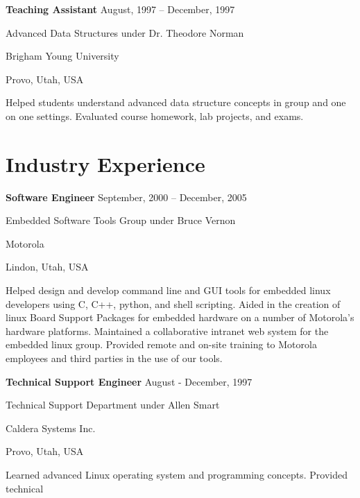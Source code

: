 \documentclass[margin,line,article,letterpaper]{res}
\newenvironment{list1}{
  \begin{list}{}{%
      \setlength{\itemsep}{0in}
      \setlength{\parsep}{0in} \setlength{\parskip}{0in}
      \setlength{\topsep}{0in} \setlength{\partopsep}{0in} 
      \setlength{\leftmargin}{0.17in}}}{\end{list}}
\newcommand{\timespan}[1]{#1}
\begin{document}
\begin{resume}
\textbf{Teaching Assistant} \hfill \timespan{August, 1997 -- December, 1997}\\
\vspace{-10pt}
\begin{list1}
\item Advanced Data Structures under Dr. Theodore Norman
\item Brigham Young University
\item Provo, Utah, USA
\vspace{6pt}
\item Helped students understand advanced data structure concepts in group and one on one 
settings. Evaluated course homework, lab projects, and exams. 
\end{list1}



\section{Industry Experience}
\textbf{Software Engineer} \hfill \timespan{September, 2000 -- December, 2005}\\
\vspace{-10pt}
\begin{list1}
\item Embedded Software Tools Group under Bruce Vernon
\item Motorola
\item Lindon, Utah, USA
\vspace{6pt}
\item Helped design and develop command line and GUI tools for embedded linux developers
using C, C++, python, and shell scripting. Aided in the creation of linux Board 
Support Packages for embedded hardware on a number of Motorola's hardware platforms. 
Maintained a collaborative intranet web system for the embedded linux group. 
Provided remote and on-site training to Motorola employees and third parties in the 
use of our tools. 
\end{list1}

\textbf{Technical Support Engineer} \hfill \timespan{August - December, 1997}\\
\vspace{-10pt}
\begin{list1}
\item Technical Support Department under Allen Smart
\item Caldera Systems Inc.
\item Provo, Utah, USA
\vspace{6pt}
\item Learned advanced Linux operating system and programming concepts. Provided technical


\end{list1}
\end{resume}
\end{document}
